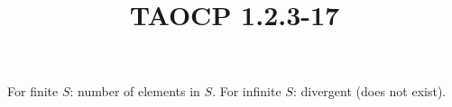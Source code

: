 \documentclass{article}
\title{TAOCP 1.2.3\mbox{-}17}
\begin{document}
\maketitle

For finite \( S \): number of elements in \( S \). For infinite \( S \): divergent (does not exist).
\end{document}
